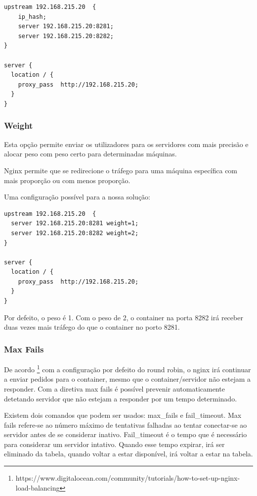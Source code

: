 \documentclass[pdftex,12pt,a4paper]{report}
\begin{document}
\begin{lstlisting}
upstream 192.168.215.20  {
	ip_hash;
    server 192.168.215.20:8281;
    server 192.168.215.20:8282;
}

server {
  location / {
    proxy_pass  http://192.168.215.20;
  }
}
\end{lstlisting}

\subsubsection{Weight}
Esta opção permite enviar os utilizadores para os servidores com mais precisão e alocar peso com peso certo para determinadas máquinas.

Nginx permite que se redirecione o tráfego para uma máquina específica com mais proporção ou com menos proporção.

Uma configuração possível para a nossa solução:

\begin{lstlisting}
upstream 192.168.215.20  {
  server 192.168.215.20:8281 weight=1;
  server 192.168.215.20:8282 weight=2;
}

server {
  location / {
    proxy_pass  http://192.168.215.20;
  }
}
\end{lstlisting}

Por defeito, o peso é 1. Com o peso de 2, o container na porta 8282 irá receber duas vezes mais tráfego do que o container no porto 8281.

\subsubsection{Max Fails}

De acordo \footnote{https://www.digitalocean.com/community/tutorials/how-to-set-up-nginx-load-balancing} com a configuração por defeito do round robin, o nginx irá continuar a enviar pedidos para o container, mesmo que o container/servidor não estejam a responder. Com a diretiva max fails é possível prevenir automaticamente detetando servidor que não estejam a responder por um tempo determinado.

Existem dois comandos que podem ser usados: max\_fails e fail\_timeout. Max fails refere-se ao número máximo de tentativas falhadas ao tentar conectar-se ao servidor antes de se considerar inativo. Fail\_timeout é o tempo que é necessário para considerar um servidor intativo. Quando esse tempo expirar, irá ser eliminado da tabela, quando voltar a estar disponível, irá voltar a estar na tabela.
\end{document}
